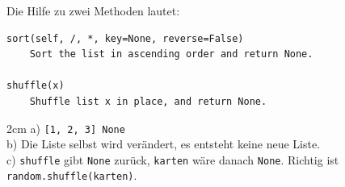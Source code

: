 \question[4]
Die Hilfe zu zwei Methoden lautet:
\begin{lstlisting}[language={}]
sort(self, /, *, key=None, reverse=False)
    Sort the list in ascending order and return None.

shuffle(x)
    Shuffle list x in place, and return None.
\end{lstlisting}
\begin{solutionbox}{2cm}
a) \texttt{[1, 2, 3] None} \\
b) Die Liste selbst wird verändert, es entsteht keine neue Liste. \\
c) \texttt{shuffle} gibt \texttt{None} zurück, \texttt{karten} wäre danach \texttt{None}. Richtig ist \texttt{random.shuffle(karten)}.
\end{solutionbox}
